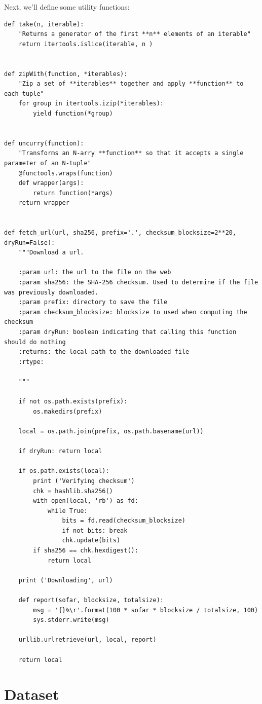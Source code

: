 Next, we'll define some utility functions:

\begin{lstlisting}
def take(n, iterable):
    "Returns a generator of the first **n** elements of an iterable"
    return itertools.islice(iterable, n )


def zipWith(function, *iterables):
    "Zip a set of **iterables** together and apply **function** to each tuple"
    for group in itertools.izip(*iterables):
        yield function(*group)


def uncurry(function):
    "Transforms an N-arry **function** so that it accepts a single parameter of an N-tuple"
    @functools.wraps(function)
    def wrapper(args):
        return function(*args)
    return wrapper


def fetch_url(url, sha256, prefix='.', checksum_blocksize=2**20, dryRun=False):
    """Download a url.

    :param url: the url to the file on the web
    :param sha256: the SHA-256 checksum. Used to determine if the file was previously downloaded.
    :param prefix: directory to save the file
    :param checksum_blocksize: blocksize to used when computing the checksum
    :param dryRun: boolean indicating that calling this function should do nothing
    :returns: the local path to the downloaded file
    :rtype:

    """

    if not os.path.exists(prefix):
        os.makedirs(prefix)

    local = os.path.join(prefix, os.path.basename(url))

    if dryRun: return local

    if os.path.exists(local):
        print ('Verifying checksum')
        chk = hashlib.sha256()
        with open(local, 'rb') as fd:
            while True:
                bits = fd.read(checksum_blocksize)
                if not bits: break
                chk.update(bits)
        if sha256 == chk.hexdigest():
            return local

    print ('Downloading', url)

    def report(sofar, blocksize, totalsize):
        msg = '{}%\r'.format(100 * sofar * blocksize / totalsize, 100)
        sys.stderr.write(msg)

    urllib.urlretrieve(url, local, report)

    return local
\end{lstlisting}

\section{Dataset}\label{dataset}

